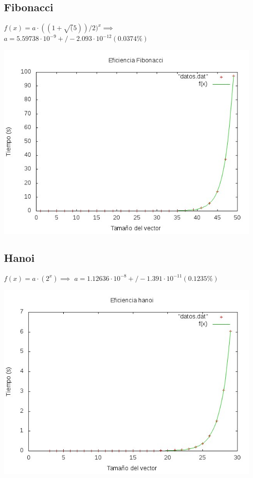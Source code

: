 \documentclass[11pt,spanish]{article} %
\begin{document}
\subsection{Fibonacci}
$ f(x) = a\cdot ((1+\sqrt(5))/2)^x \implies$
$a               = 5.59738\cdot 10^{-9}      +/- 2.093\cdot 10^{-12}    (0.0374\%)$

\begin{center}
\includegraphics[scale=0.55]{../Graficas/Fibonacci/fibonacciO0_ruben.jpeg}
\end{center}
\newpage
\subsection{Hanoi}
$f(x) = a\cdot(2^x) \implies$
$a               = 1.12636\cdot 10^{-8}      +/- 1.391\cdot 10^{-11}    (0.1235\%)$
\begin{center}
\includegraphics[scale=0.55]{../Graficas/Hanoi/hanoiO0_ruben.jpeg}
\end{center}
\end{document}
